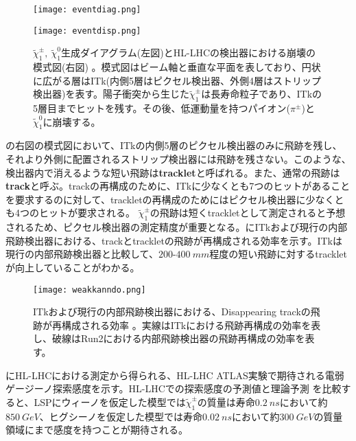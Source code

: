 \begin{figure}[tbp]
  \begin{minipage}[b]{0.38\linewidth}
    \centering
    \texttt{[image: eventdiag.png]}
  \end{minipage}
  \begin{minipage}[b]{0.62\linewidth}
    \centering
    \texttt{[image: eventdisp.png]}
  \end{minipage}
  \caption[$\tilde{\chi}_1^{\pm},\ \tilde{\chi}_1^0$生成ダイアグラムと崩壊の模式図]{$\tilde{\chi}_1^{\pm},\ \tilde{\chi}_1^0$生成ダイアグラム(左図)とHL-LHCの検出器における崩壊の模式図(右図) \cite{winos}。模式図はビーム軸と垂直な平面を表しており、円状に広がる層はITk(内側5層はピクセル検出器、外側4層はストリップ検出器)を表す。陽子衝突から生じた$\tilde{\chi}_1^{\pm}$は長寿命粒子であり、ITkの5層目までヒットを残す。その後、低運動量を持つパイオン($\pi^{\pm}$)と$\tilde{\chi}_1^0$に崩壊する。}
  \label{fig:eventchargeno}
\end{figure}


の右図の模式図において、ITkの内側5層のピクセル検出器のみに飛跡を残し、それより外側に配置されるストリップ検出器には飛跡を残さない。このような、検出器内で消えるような短い飛跡は\textbf{tracklet}と呼ばれる。また、通常の飛跡は\textbf{track}と呼ぶ。trackの再構成のために、ITkに少なくとも7つのヒットがあることを要求するのに対して、trackletの再構成のためにはピクセル検出器に少なくとも4つのヒットが要求される。
$\tilde{\chi}_1^{\pm}$の飛跡は短くtrackletとして測定されると予想されるため、ピクセル検出器の測定精度が重要となる。にITkおよび現行の内部飛跡検出器における、trackとtrackletの飛跡が再構成される効率を示す。ITkは現行の内部飛跡検出器と比較して、$200$-$400\ \si{mm}$程度の短い飛跡に対するtrackletが向上していることがわかる。

\begin{figure}[tbp]
  \centering
  \texttt{[image: weakkanndo.png]}
  \caption[ITkおよび現行の内部飛跡検出器における、Disappearing trackの飛跡再構成効率]{ITkおよび現行の内部飛跡検出器における、Disappearing trackの飛跡が再構成される効率 \cite{itk}。実線はITkにおける飛跡再構成の効率を表し、破線はRun2における内部飛跡検出器の飛跡再構成の効率を表す。}
  \label{fig:weakkanndo}
\end{figure}

にHL-LHCにおける測定から得られる、HL-LHC ATLAS実験で期待される電弱ゲージーノ探索感度を示す。HL-LHCでの探索感度の予測値と理論予測 \cite{winoriron}を比較すると、LSPにウィーノを仮定した模型では$\tilde{\chi}_1^{\pm}$の質量は寿命$0.2\ \si{ns}$において約$850\ \si{GeV}$、ヒグシーノを仮定した模型では寿命$0.02\ \si{ns}$において約$300\ \si{GeV}$の質量領域にまで感度を持つことが期待される。

